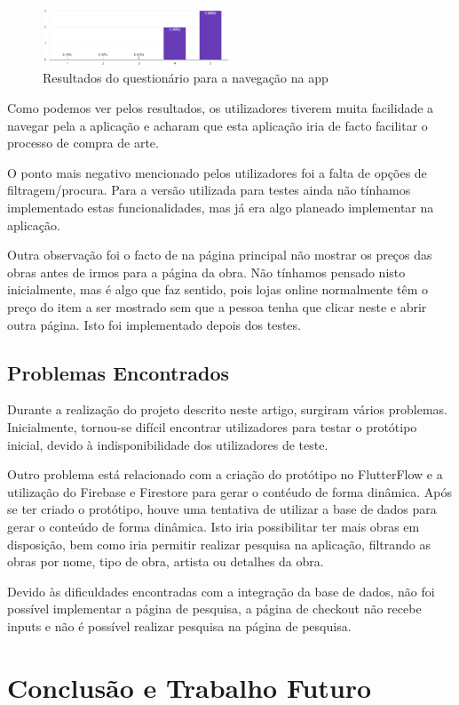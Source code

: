 \documentclass[conference]{IEEEtran}
\begin{document}
\begin{figure}[ht]
    \centering
    \includegraphics[width=0.5\textwidth]{questionarioFacilitar.png}
    \caption{Resultados do questionário para a navegação na app}
    \label{fig:facilitaTest}
\end{figure}

Como podemos ver pelos resultados, os utilizadores tiverem muita facilidade a navegar pela a aplicação e acharam que esta aplicação iria de facto facilitar o processo de compra de arte.

O ponto mais negativo mencionado pelos utilizadores foi a falta de opções de filtragem/procura. Para a versão utilizada para testes ainda não tínhamos implementado estas funcionalidades, mas já era algo planeado implementar na aplicação.

Outra observação foi o facto de na página principal não mostrar os preços das obras antes de irmos para a página da obra. Não tínhamos pensado nisto inicialmente, mas é algo que faz sentido, pois lojas online normalmente têm o preço do item a ser mostrado sem que a pessoa tenha que clicar neste e abrir outra página. Isto foi implementado depois dos testes.

\subsection{Problemas Encontrados}

Durante a realização do projeto descrito neste artigo, surgiram vários problemas. Inicialmente, tornou-se difícil 
encontrar utilizadores para testar o protótipo inicial, devido à indisponibilidade dos utilizadores de teste. 

Outro problema está relacionado com a criação do protótipo no FlutterFlow 
e a utilização do Firebase e Firestore para gerar o contéudo de forma dinâmica. 
Após se ter criado o protótipo, houve uma tentativa de utilizar a base de dados para 
gerar o conteúdo de forma dinâmica. Isto iria possibilitar ter mais obras em disposição, 
bem como iria permitir realizar pesquisa na aplicação, filtrando as obras por nome, 
tipo de obra, artista ou detalhes da obra.

Devido às dificuldades encontradas com a integração da base de dados, 
não foi possível implementar a página de pesquisa, a página de checkout não 
recebe inputs e não é possível realizar pesquisa na página de pesquisa.


\section{Conclusão e Trabalho Futuro}



\end{document}
